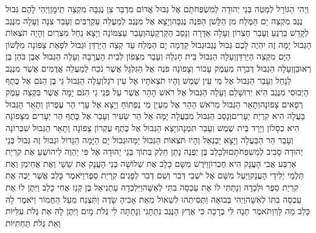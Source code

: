\documentclass[../main/main.tex]{subfiles}
\begin{document}
\begin{multicols*}{\ncols}
וַיְהִי הַגּוֹרָל לְמַטֵּה בְּנֵי יְהוּדָה לְמִשְׁפְּחֹתָם אֶל גְּבוּל אֱדוֹם מִדְבַּר צִן נֶגְבָּה מִקְצֵה תֵימָן\PreVerseSpace{}וַיְהִי לָהֶם גְּבוּל נֶגֶב מִקְצֵה יָם הַמֶּלַח מִן הַלָּשֹׁן הַפֹּנֶה נֶגְבָּה\PreVerseSpace{}וְיָצָא אֶל מִנֶּגֶב לְמַעֲלֵה עַקְרַבִּים וְעָבַר צִנָה וְעָלָה מִנֶּגֶב לְקָדֵשׁ בַּרְנֵעַ וְעָבַר חֶצְרוֹן וְעָלָה אַדָּרָה וְנָסַב הַקַּרְקָעָה\PreVerseSpace{}וְעָבַר עַצְמוֹנָה וְיָצָא נַחַל מִצְרַיִם וְהָיָה תֹּצְאוֹת הַגְּבוּל יָמָּה זֶה יִהְיֶה לָכֶם גְּבוּל נֶגֶב\PreVerseSpace{}וּגְבוּל קֵדְמָה יָם הַמֶּלַח עַד קְצֵה הַיַּרְדֵּן וּגְבוּל לִפְאַת צָפוֹנָה מִלְּשׁוֹן הַיָּם מִקְצֵה הַיַּרְדֵּן\PreVerseSpace{}וְעָלָה הַגְּבוּל בֵּית חָגְלָה וְעָבַר מִצְּפוֹן לְבֵית הָעֲרָבָה וְעָלָה הַגְּבוּל אֶבֶן בֹּהַן בֶּן רְאוּבֵן\PreVerseSpace{}וְעָלָה הַגְּבוּל דְּבִרָה מֵעֵמֶק עָכוֹר וְצָפוֹנָה פֹּנֶה אֶל הַגִּלְגָּל אֲשֶׁר נֹכַח לְמַעֲלֵה אֲדֻמִּים אֲשֶׁר מִנֶּגֶב לַנָּחַל וְעָבַר הַגְּבוּל אֶל מֵי עֵין שֶׁמֶשׁ וְהָיוּ תֹצְאֹתָיו אֶל עֵין רֹגֵל\PreVerseSpace{}וְעָלָה הַגְּבוּל גֵּי בֶן הִנֹּם אֶל כֶּתֶף הַיְבוּסִי מִנֶּגֶב הִיא יְרוּשָׁלֵם וְעָלָה הַגְּבוּל אֶל רֹאשׁ הָהָר אֲשֶׁר עַל פְּנֵי גֵי הִנֹּם יָמָּה אֲשֶׁר בִּקְצֵה עֵמֶק רְפָאִים צָפוֹנָה\PreVerseSpace{}וְתָאַר הַגְּבוּל מֵרֹאשׁ הָהָר אֶל מַעְיַן מֵי נֶפְתּוֹחַ וְיָצָא אֶל עָרֵי הַר עֶפְרוֹן וְתָאַר הַגְּבוּל בַּעֲלָה הִיא קִרְיַת יְעָרִים\PreVerseSpace{}וְנָסַב הַגְּבוּל מִבַּעֲלָה יָמָּה אֶל הַר שֵׂעִיר וְעָבַר אֶל כֶּתֶף הַר יְעָרִים מִצָּפוֹנָה הִיא כְסָלוֹן וְיָרַד בֵּית שֶׁמֶשׁ וְעָבַר תִּמְנָה\PreVerseSpace{}וְיָצָא הַגְּבוּל אֶל כֶּתֶף עֶקְרוֹן צָפוֹנָה וְתָאַר הַגְּבוּל שִׁכְּרוֹנָה וְעָבַר הַר הַבַּעֲלָה וְיָצָא יַבְנְאֵל וְהָיוּ תֹּצְאוֹת הַגְּבוּל יָמָּה\PreVerseSpace{}וּגְבוּל יָם הַיָּמָּה הַגָּדוֹל וּגְבוּל זֶה גְּבוּל בְּנֵי יְהוּדָה סָבִיב לְמִשְׁפְּחֹתָם\PreVerseSpace{}וּלְכָלֵב בֶּן יְפֻנֶּה נָתַן חֵלֶק בְּתוֹךְ בְּנֵי יְהוּדָה אֶל פִּי יַהְוֶה לִיהוֹשֻׁעַ אֶת קִרְיַת אַרְבַּע אֲבִי הָעֲנָק הִיא חֶבְרוֹן\PreVerseSpace{}וַיֹּרֶשׁ מִשָּׁם כָּלֵב אֶת שְׁלוֹשָׁה בְּנֵי הָעֲנָק אֶת שֵׁשַׁי וְאֶת אֲחִימַן וְאֶת תַּלְמַי יְלִידֵי הָעֲנָק\PreVerseSpace{}וַיַּעַל מִשָּׁם אֶל יֹשְׁבֵי דְּבִר וְשֵׁם דְּבִר לְפָנִים קִרְיַת סֵפֶר\PreVerseSpace{}וַיֹּאמֶר כָּלֵב אֲשֶׁר יַכֶּה אֶת קִרְיַת סֵפֶר וּלְכָדָהּ וְנָתַתִּי לוֹ אֶת עַכְסָה בִתִּי לְאִשָּׁה\PreVerseSpace{}וַיִּלְכְּדָהּ עָתְנִיאֵל בֶּן קְנַז אֲחִי כָלֵב וַיִּתֶּן לוֹ אֶת עַכְסָה בִתּוֹ לְאִשָּׁה\PreVerseSpace{}וַיְהִי בְּבוֹאָהּ וַתְּסִיתֵהוּ לִשְׁאוֹל מֵאֵת אָבִיהָ שָׂדֶה וַתִּצְנַח מֵעַל הַחֲמוֹר וַיֹּאמֶר לָהּ כָּלֵב מַה לָּךְ\PreVerseSpace{}וַתֹּאמֶר תְּנָה לִּי בְרָכָה כִּי אֶרֶץ הַנֶּגֶב נְתַתָּנִי וְנָתַתָּה לִי גֻּלֹּת מָיִם וַיִּתֶּן לָהּ אֵת גֻּלֹּת עִלִּיּוֹת וְאֵת גֻּלֹּת תַּחְתִּיּוֹת\OpenSection{}\par

\end{multicols*}
\end{document}
